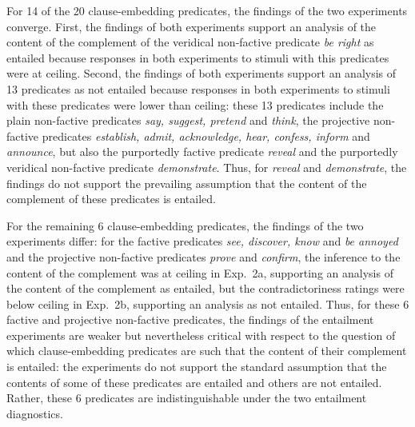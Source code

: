 \documentclass[11pt,fleqn]{article}
\newcommand{\6}{\mbox{$[\hspace*{-.6mm}[$}}
\newcommand{\9}{\mbox{$]\hspace*{-.6mm}]$}}
\begin{document}
{For 14 of the 20 clause-embedding predicates, the findings of the two experiments converge. First, the findings of both experiments support an analysis of the content of the complement of the veridical non-factive predicate {\em be right} as entailed because responses in both experiments to stimuli with this predicates were at ceiling. Second, the findings of both experiments support an analysis of 13 predicates as not entailed because responses in both experiments to stimuli with these predicates were lower than ceiling:  these 13 predicates include the plain non-factive predicates {\em say, suggest, pretend} and {\em think}, the projective non-factive predicates {\em establish, admit, acknowledge, hear, confess, inform} and {\em announce}, but also the purportedly factive predicate {\em reveal} and the purportedly veridical non-factive predicate {\em demonstrate}. Thus, for {\em reveal} and {\em demonstrate}, the findings do not support the prevailing assumption that the content of the complement of these predicates is entailed. 

For the remaining 6 clause-embedding predicates, the findings of the two experiments differ: for the factive predicates  {\em see, discover, know} and {\em be annoyed}  and the projective non-factive predicates {\em prove} and {\em confirm}, the inference to the content of the complement was at ceiling in Exp.~2a, supporting an analysis of the content of the complement as entailed, but the contradictoriness ratings were below ceiling in Exp.~2b, supporting an analysis as not entailed. Thus, for these 6 factive and projective non-factive predicates, the findings of the entailment experiments are weaker but nevertheless critical with respect to the question of which clause-embedding predicates are such that the content of their complement is entailed: the experiments do not support the standard assumption that the contents of some of these predicates are entailed and others are not entailed. Rather, these 6 predicates are indistinguishable under the two entailment diagnostics.

}
\end{document}
